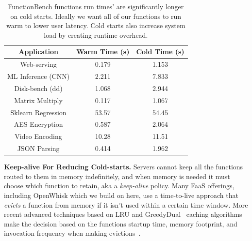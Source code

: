 \begin{table}
  \begin{tabular}{ c c c }
\hline
  Application & Warm Time (s) & Cold Time (s) \\ 
\hline
  Web-serving & 0.179 & 1.153 \\  
  ML Inference (CNN) & 2.211 & 7.833 \\
  Disk-bench (dd) & 1.068 & 2.944 \\  
  Matrix Multiply & 0.117 & 1.067 \\  
  Sklearn Regression & 53.57 & 54.45 \\  
  AES Encryption & 0.587 & 2.064 \\  
  Video Encoding & 10.28 & 11.51 \\  
  JSON Parsing & 0.414 & 1.962 \\
\hline
\end{tabular}
\caption{FunctionBench \cite{kim_functionbench_2019} functions run times' are significantly longer on cold starts. Ideally we want all of our functions to run warm to lower user latency. Cold starts also increase system load by creating runtime overhead.}
\label{tab:func-times}
\end{table}



\noindent \textbf{Keep-alive For Reducing Cold-starts.}
Servers cannot keep all the functions routed to them in memory indefinitely, and when memory is needed it must choose which function to retain, aka a \emph{keep-alive} policy.
Many FaaS offerings, including OpenWhisk which we build on here, use a time-to-live approach that \emph{evicts} a function from memory if it isn't used within a certain time window.
%
More recent advanced techniques based on LRU and GreedyDual~\cite{gdsf} caching algorithms make the decision based on the functions startup time, memory footprint, and invocation frequency when making evictions~\cite{faascache-asplos21}.


